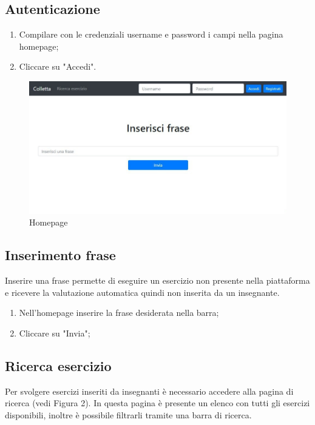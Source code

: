 \documentclass[11pt,a4paper]{article}
\begin{document}
{	\subsection{Autenticazione}
	\begin{enumerate}
		\item Compilare con le credenziali username e password i campi nella pagina homepage;
		\item Cliccare su "Accedi".
	\end{enumerate}

	\begin{figure}[h]
		\centering
		\includegraphics[scale=0.65]{images/home.jpg}
		\caption{Homepage}
	\end{figure}

	\subsection{Inserimento frase}
	Inserire una frase permette di eseguire un esercizio non presente nella piattaforma e ricevere la valutazione automatica quindi non inserita da un insegnante.	
	\begin{enumerate}
		\item Nell'homepage inserire la frase desiderata nella barra;
		\item Cliccare su "Invia";
		
	\end{enumerate}

	\subsection{Ricerca esercizio}
	Per svolgere esercizi inseriti da insegnanti è necessario accedere alla pagina di ricerca (vedi Figura 2). In questa pagina è presente un elenco con tutti gli esercizi disponibili, inoltre è possibile filtrarli tramite una barra di ricerca.
	
}
\end{document}
